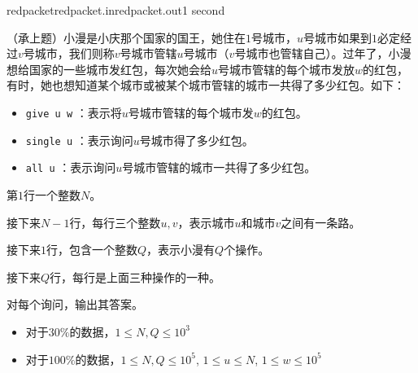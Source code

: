 \documentclass[11pt,a4paper,oneside]{article}
\begin{document}
\begin{problem}{redpacket}{redpacket.in}{redpacket.out}{1 second} 
    
    （承上题）小漫是小庆那个国家的国王，她住在$1$号城市，$u$号城市如果到$1$必定经过$v$号城市，我们则称$v$号城市管辖$u$号城市（$v$号城市也管辖自己）。过年了，小漫想给国家的一些城市发红包，每次她会给$u$号城市管辖的每个城市发放$w$的红包，有时，她也想知道某个城市或被某个城市管辖的城市一共得了多少红包。如下：
    \begin{itemize}
    	\item \texttt{give u w} ：表示将$u$号城市管辖的每个城市发$w$的红包。
    	\item \texttt{single u} ：表示询问$u$号城市得了多少红包。
    	\item \texttt{all u} ：表示询问$u$号城市管辖的城市一共得了多少红包。
    \end{itemize}
    
    \InputFile

	第$1$行一个整数$N$。	
	
	接下来$N-1$行，每行三个整数$u, v$，表示城市$u$和城市$v$之间有一条路。
	
	接下来$1$行，包含一个整数$Q$，表示小漫有$Q$个操作。
	
	接下来$Q$行，每行是上面三种操作的一种。

    \OutputFile

    对每个询问，输出其答案。

    \Example

    \begin{example}
    \end{example}

    \Note
    
    \begin{itemize}
    	\item 对于$30\%$的数据，$1 \leq N, Q \leq 10^3$
        \item 对于$100\%$的数据，$1 \leq N, Q \leq 10^5$, $1 \leq u \leq N$, $1 \leq w \leq 10^5$
    \end{itemize}

\end{problem}
\end{document}

